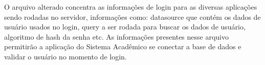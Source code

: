 \begin{framed}
	
\end{framed}

O arquivo alterado concentra as informações de login para as diversas aplicações
sendo rodadas no servidor, informações como: datasource que contém os dados de
usuário usados no login, query a ser rodada para buscar os dados de usuário,
algoritmo de hash da senha etc. As informações presentes nesse arquivo
permitirão a aplicação do Sistema Acadêmico se conectar a base de dados e validar o usuário no momento de login.
